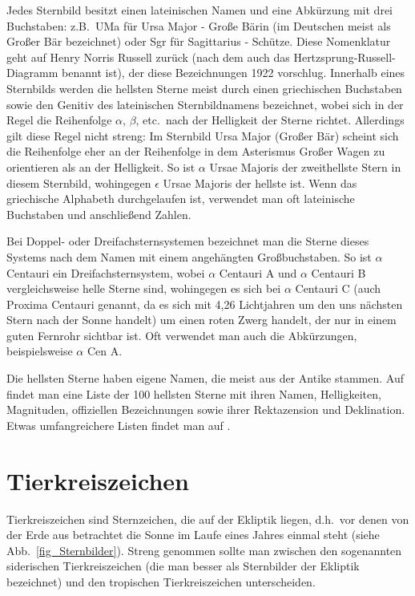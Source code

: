 Jedes Sternbild besitzt einen lateinischen Namen und eine Abk\"urzung mit drei Buchstaben: z.B.\ UMa f\"ur 
Ursa Major
 - Gro\ss e B\"arin (im Deutschen meist als Gro\ss er B\"ar bezeichnet) oder Sgr f\"ur 
 Sagittarius - Sch\"utze.
Diese Nomenklatur geht auf Henry Norris Russell zur\"uck (nach dem auch das Hertzsprung-Russell-Diagramm
benannt ist), der diese Bezeichnungen 1922 vorschlug. Innerhalb eines Sternbilds werden die hellsten Sterne
meist durch einen griechischen Buchstaben sowie den Genitiv des lateinischen Sternbildnamens 
bezeichnet, wobei sich in
der Regel die Reihenfolge $\alpha$, $\beta$, etc.\ nach der Helligkeit der Sterne richtet. Allerdings gilt diese Regel
nicht streng: Im Sternbild Ursa Major (Gro\ss er B\"ar) scheint sich die Reihenfolge eher an der Reihenfolge in
dem Asterismus Gro\ss er Wagen zu orientieren als an der Helligkeit. So ist $\alpha$ Ursae Majoris der zweithellste
Stern in diesem Sternbild, wohingegen $\epsilon$ Ursae Majoris der hellste ist. Wenn das griechische Alphabeth
durchgelaufen ist, verwendet man oft lateinische Buchstaben und anschlie\ss end Zahlen. 

Bei Doppel- oder Dreifachsternsystemen bezeichnet man die Sterne dieses Systems nach dem Namen mit einem
angeh\"angten Gro\ss buchstaben.
So ist $\alpha$ Centauri ein 
Dreifachsternsystem, wobei $\alpha$ Centauri A und $\alpha$ Centauri B
vergleichsweise helle Sterne sind, wohingegen es sich bei 
$\alpha$ Centauri C (auch Proxima Centauri genannt, da
es sich mit 4,26 Lichtjahren um den uns n\"achsten Stern nach der Sonne handelt) um einen roten Zwerg handelt, der
nur in einem guten Fernrohr sichtbar ist. Oft verwendet man auch die Abk\"urzungen, beispielsweise $\alpha$ Cen A. 

Die hellsten Sterne haben eigene Namen, die meist aus der Antike stammen. Auf \cite{Wiki_hellste} findet man
eine Liste der 100 hellsten Sterne mit ihren Namen, Helligkeiten, Magnituden, offiziellen Bezeichnungen sowie
ihrer Rektazension und Deklination. Etwas umfangreichere Listen findet man auf \cite{brightest}.         

\section{Tierkreiszeichen}

Tierkreiszeichen 
sind Sternzeichen, die auf der Ekliptik liegen, d.h.\ vor denen von der Erde aus betrachtet 
die Sonne im Laufe eines Jahres einmal steht (siehe Abb.\ \ref{fig_Sternbilder}). 
Streng genommen sollte man zwischen den sogenannten
siderischen Tierkreiszeichen (die man besser als Sternbilder der Ekliptik bezeichnet) 
und den tropischen Tierkreiszeichen unterscheiden. 

